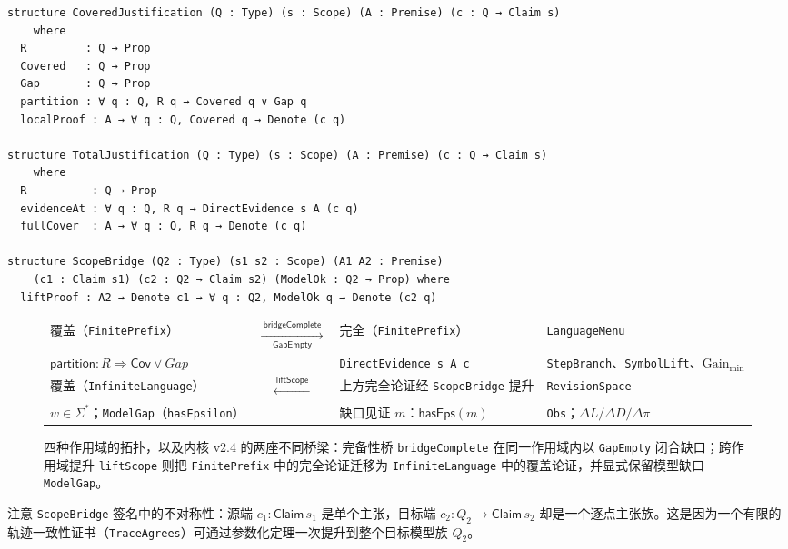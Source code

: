 \documentclass[11pt,a4paper,UTF8,fontset=fandol]{ctexart}
\DeclareRobustCommand{\id}[1]{\nolinkurl{#1}}
\newcommand{\Gap}{\mathit{Gap}}
\begin{document}
\begin{lstlisting}[caption={经验证的内核 v2.4（Lean 4.36.0）：逐点依赖的主张、逐点证据与条件式作用域桥。}]
structure CoveredJustification (Q : Type) (s : Scope) (A : Premise) (c : Q → Claim s)
    where
  R         : Q → Prop
  Covered   : Q → Prop
  Gap       : Q → Prop
  partition : ∀ q : Q, R q → Covered q ∨ Gap q
  localProof : A → ∀ q : Q, Covered q → Denote (c q)

structure TotalJustification (Q : Type) (s : Scope) (A : Premise) (c : Q → Claim s)
    where
  R          : Q → Prop
  evidenceAt : ∀ q : Q, R q → DirectEvidence s A (c q)
  fullCover  : A → ∀ q : Q, R q → Denote (c q)

structure ScopeBridge (Q2 : Type) (s1 s2 : Scope) (A1 A2 : Premise)
    (c1 : Claim s1) (c2 : Q2 → Claim s2) (ModelOk : Q2 → Prop) where
  liftProof : A2 → Denote c1 → ∀ q : Q2, ModelOk q → Denote (c2 q)
\end{lstlisting}

\begin{figure}[htbp]
\centering\small
\begin{tabularx}{\linewidth}{@{}XcXX@{}}
\toprule
覆盖（\id{FinitePrefix}） &
$\xrightarrow[\mathsf{GapEmpty}]{\ \mathsf{bridgeComplete}\ }$ &
完全（\id{FinitePrefix}） & \id{LanguageMenu} \\
$\mathsf{partition}:R\Rightarrow\mathsf{Cov}\lor\Gap$ &&
\id{DirectEvidence s A c} & \id{StepBranch}、\id{SymbolLift}、$\mathrm{Gain}_{\min}$ \\
\midrule
覆盖（\id{InfiniteLanguage}） &
$\xleftarrow{\ \mathsf{liftScope}\ }$ &
上方完全论证经 \id{ScopeBridge} 提升 & \id{RevisionSpace} \\
$w\in\Sigma^*$；\id{ModelGap}（\id{hasEpsilon}） &&
缺口见证 $m$：$\mathsf{hasEps}(m)$ &
\id{Obs}；$\Delta L/\Delta D/\Delta\pi$ \\
\bottomrule
\end{tabularx}
\caption{四种作用域的拓扑，以及内核 v2.4 的两座不同桥梁：完备性桥 \id{bridgeComplete} 在同一作用域内以 \id{GapEmpty} 闭合缺口；跨作用域提升 \id{liftScope} 则把 \id{FinitePrefix} 中的完全论证迁移为 \id{InfiniteLanguage} 中的覆盖论证，并显式保留模型缺口 \id{ModelGap}。}
\end{figure}

注意 \id{ScopeBridge} 签名中的不对称性：源端 $c_1:\mathsf{Claim}\,s_1$ 是单个主张，目标端 $c_2:Q_2\to\mathsf{Claim}\,s_2$ 却是一个逐点主张族。这是因为一个有限的轨迹一致性证书（\id{TraceAgrees}）可通过参数化定理一次提升到整个目标模型族 $Q_2$。
\end{document}
